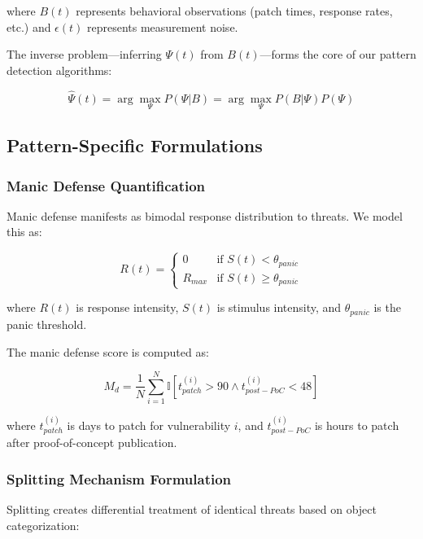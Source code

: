 \documentclass[11pt,a4paper]{article}
\begin{document}
where $B(t)$ represents behavioral observations (patch times, response rates, etc.) and $\epsilon(t)$ represents measurement noise.

The inverse problem—inferring $\Psi(t)$ from $B(t)$—forms the core of our pattern detection algorithms:

\begin{equation}
\hat{\Psi}(t) = \arg\max_{\Psi} P(\Psi|B) = \arg\max_{\Psi} P(B|\Psi)P(\Psi)
\end{equation}

\subsection{Pattern-Specific Formulations}

\subsubsection{Manic Defense Quantification}

Manic defense manifests as bimodal response distribution to threats. We model this as:

\begin{equation}
R(t) = \begin{cases}
0 & \text{if } S(t) < \theta_{panic} \\
R_{max} & \text{if } S(t) \geq \theta_{panic}
\end{cases}
\end{equation}

where $R(t)$ is response intensity, $S(t)$ is stimulus intensity, and $\theta_{panic}$ is the panic threshold.

The manic defense score is computed as:

\begin{equation}
M_d = \frac{1}{N}\sum_{i=1}^{N} \mathbb{I}[t_{patch}^{(i)} > 90 \land t_{post-PoC}^{(i)} < 48]
\end{equation}

where $t_{patch}^{(i)}$ is days to patch for vulnerability $i$, and $t_{post-PoC}^{(i)}$ is hours to patch after proof-of-concept publication.

\subsubsection{Splitting Mechanism Formulation}

Splitting creates differential treatment of identical threats based on object categorization:
\end{document}
